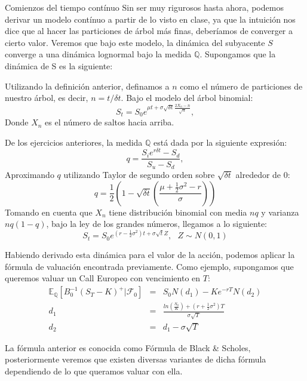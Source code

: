 \documentclass[11pt]{beamer}
\newcommand\diagram[2]{\schema{\schemabox{#1}}{\schemabox{#2}}}
\begin{document}
\begin{frame}{Comienzos del tiempo contínuo}
	Sin ser muy rigurosos hasta ahora, podemos derivar un modelo contínuo a partir de lo visto en clase, ya que la intuición nos dice que al hacer las particiones de árbol más finas, deberíamos de converger a cierto valor. Veremos que bajo este modelo, la dinámica del subyacente $S$ converge a una dinámica lognormal bajo la medida $\mathbb{Q}$.
	Supongamos que la dinámica de S es la siguiente:\bigskip
	\begin{center}
	\diagram{$S_{i+1}=$}
	{ $S_u=S_i e^{\mu \delta t +\sigma \sqrt{\delta t}}$  \\
	\\
	$S_d=S_i e^{\mu \delta t -\sigma \sqrt{\delta t}}$ } 
\end{center}
Utilizando la definición anterior, definamos a $n$ como el número de particiones de nuestro árbol, es decir, $n=t/ \delta t$.
Bajo el modelo del árbol binomial:
\begin{equation}
S_t=S_0e^{\mu t +\sigma \sqrt{\delta t} \frac{2 X_n-n}{\sqrt{n}}},
\end{equation}
Donde $X_n$ es el número de saltos hacia arriba.
\end{frame}
\begin{frame}{{}}
	De los ejercicios anteriores, la medida $\mathbb{Q}$ está dada por la siguiente expresión:
	\begin{equation}
	q=\frac{S_i e^{r\delta t}-S_d}{S_u-S_d},
	\end{equation}
	Aproximando $q$ utilizando Taylor de segundo orden sobre $\sqrt{\delta t}$ alrededor de 0:
	\begin{equation}
	q=\frac{1}{2}\left(1-\sqrt{\delta t}\left(\frac{\mu +\frac{1}{2}\sigma^{2}-r}{\sigma}\right)\right)
	\end{equation}
	Tomando en cuenta que $X_n$ tiene distribución binomial con media $nq$ y varianza $nq(1-q)$, bajo la ley de los grandes números, llegamos a lo siguiente:
		\begin{equation}
	S_t=S_0e^{(r-\frac{1}{2}\sigma^{2})t+\sigma \sqrt{t}Z}, \ \ \ Z \sim N(0,1)
	\end{equation}
\end{frame}
\begin{frame}{{}}
	Habiendo derivado esta dinámica para el valor de la acción, podemos aplicar la fórmula de valuación encontrada previamente. Como ejemplo, supongamos que queremos valuar un Call Europeo con vencimiento en $T$:
	\begin{eqnarray*}
	\mathbb{E}_{\mathbb{Q}}\left[B_0^{-1}(S_T-K)^{+} | \mathscr{F}_0\right]&=& S_0N(d_1)-Ke^{-rT}N(d_2)\\
	d_1&=&\frac{ln(\frac{S_0}{K})+(r+\frac{1}{2}\sigma^{2})T}{\sigma \sqrt{T}}\\
	d_2&=&d_1-\sigma \sqrt{T}
	\end{eqnarray*}

La fórmula anterior es conocida como Fórmula de Black \& Scholes, posteriormente veremos que existen diversas variantes de dicha fórmula dependiendo de lo que queramos valuar con ella.
\end{frame}
	
\end{document}
